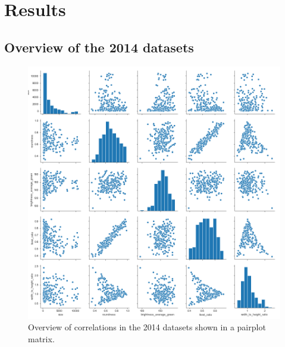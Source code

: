 \documentclass[paper=A4,bibliography=totocnumbered]{scrartcl}
\begin{document}
\section{Results}
\subsection{Overview of the 2014 datasets}

\begin{figure}
	\centering
	\includegraphics[width=13cm]{pic/overview}
	\caption{Overview of correlations in the 2014 datasets shown in a pairplot matrix.}
	\label{fig:overview}
\end{figure}
\end{document}
